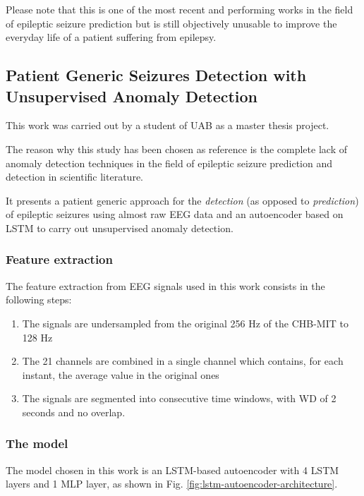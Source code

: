Please note that this is one of the most recent and performing works in the field of epileptic seizure prediction but is still objectively unusable to improve the everyday life of a patient suffering from epilepsy.

\subsection[Patient Generic Seizures Detection with Unsupervised\\Anomaly Detection]{Patient Generic Seizures Detection with Unsupervised Anomaly Detection} \label{subsec:refwork-uab}
This work was carried out by a student of \gls{UAB} as a master thesis project.

The reason why this study has been chosen as reference is the complete lack of anomaly detection techniques in the field of epileptic seizure prediction and detection in scientific literature.

It presents a patient generic approach for the \textit{detection} (as opposed to \textit{prediction}) of epileptic seizures using almost raw \gls{EEG} data and an autoencoder based on \gls{LSTM} to carry out unsupervised anomaly detection.
\subsubsection{Feature extraction} \label{subsub:refwork-uab-featext}
The feature extraction from \gls{EEG} signals used in this work consists in the following steps:

\begin{enumerate}
    \item The signals are undersampled from the original 256 Hz of the \gls{CHB-MIT} to 128 Hz
    \item The 21 channels are combined in a single channel which contains, for each instant, the average value in the original ones
    \item The signals are segmented into consecutive time windows, with \gls{WD} of 2 seconds and no overlap.
\end{enumerate}

\subsubsection{The model}
The model chosen in this work is an \gls{LSTM}-based autoencoder with 4 \gls{LSTM} layers and 1 \gls{MLP} layer, as shown in Fig. \ref{fig:lstm-autoencoder-architecture}.

